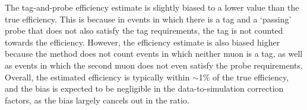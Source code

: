 The tag-and-probe efficiency estimate is slightly biased to a lower value than 
the true efficiency. This is because in events in which there is a tag and a 
`passing' probe that does not also satisfy the tag requirements, the tag is not 
counted towards the efficiency. However, the efficiency estimate is also biased 
higher because the method does not count events in which neither muon is a tag, 
as well as events in which the second muon does not even satisfy the probe 
requirements. Overall, the estimated efficiency is typically within $\sim$1\% 
of the true efficiency, and the bias is expected to be negligible in the 
data-to-simulation correction factors, as the bias largely cancels out in the 
ratio.

